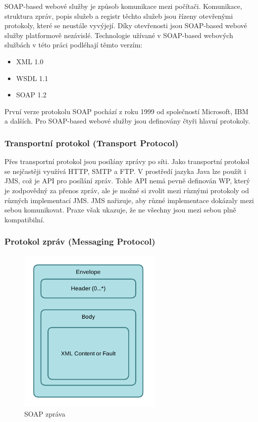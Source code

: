 \documentclass[11pt,twoside,a4paper]{book}
\begin{document}
SOAP-based webové služby \cite{Kalin13} je způsob komunikace mezi počítači. Komunikace,
struktura zpráv, popis služeb a registr těchto služeb jsou řízeny otevřenými protokoly, které se
neustále vyvýjejí. Díky otevřenosti jsou SOAP-based webové služby platformově
nezávislé. Technologie užívané v SOAP-based webových službách v této práci
podléhají těmto verzím:

\begin{itemize}
 \item XML 1.0
  \item WSDL 1.1
  \item SOAP 1.2
\end{itemize}

První verze protokolu SOAP pochází z roku 1999 od společností Microsoft, IBM a
dalších. Pro SOAP-based webové služby jsou definovány čtyři hlavní protokoly.

\subsubsection{Transportní protokol (Transport Protocol)}

Přes transportní protokol jsou posílány zprávy po síti. Jako transportní
protokol se nejčastěji využívá HTTP, SMTP a FTP. V prostředí jazyka Java lze
použít i JMS, což je API pro posílání zpráv. Tohle API nemá pevně definován WP,
který je zodpovědný za přenos zpráv, ale je možné si zvolit mezi různými
protokoly od různých implementací JMS. JMS nařizuje, aby různé implementace
dokázaly mezi sebou komunikovat. Praxe však ukazuje, že ne všechny jsou mezi
sebou plně kompatibilní.

\subsubsection{Protokol zpráv (Messaging Protocol)}

\begin{figure}[h]
\begin{center}
\includegraphics[width=7cm]{images-pdf/soap.pdf} 
\caption{SOAP zpráva}
\label{fig:soap-zprava}
\end{center}
\end{figure}
\end{document}
